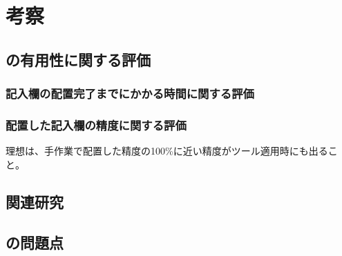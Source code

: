 \chapter{考察}\label{cha:Discussion}



\section{\toolName の有用性に関する評価}\label{sec:evalue_usefulness}

\subsection{記入欄の配置完了までにかかる時間に関する評価}\label{subsec:evalue_required_time}

\subsection{配置した記入欄の精度に関する評価}\label{subsec:evalue_accuracy}
理想は、手作業で配置した精度の100\%に近い精度がツール適用時にも出ること。



\section{関連研究}\label{sec:relation_research}



\section{\toolName の問題点}\label{sec:AWSEL_problems}
